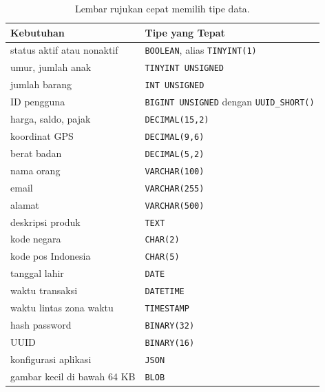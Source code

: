 \documentclass[11pt,a4paper]{article}
\begin{document}
\begin{table}[H]
	\centering
	\caption{Lembar rujukan cepat memilih tipe data.}
	\label{tab:cheat}
	\footnotesize
	\begin{tabularx}{\textwidth}{l X}
		\toprule
		Kebutuhan                   & Tipe yang Tepat                                        \\
		\midrule
		status aktif atau nonaktif  & \texttt{BOOLEAN}, alias \texttt{TINYINT(1)}            \\
		umur, jumlah anak           & \texttt{TINYINT UNSIGNED}                              \\
		jumlah barang               & \texttt{INT UNSIGNED}                                  \\
		ID pengguna                 & \texttt{BIGINT UNSIGNED} dengan \texttt{UUID\_SHORT()} \\
		harga, saldo, pajak         & \texttt{DECIMAL(15,2)}                                 \\
		koordinat GPS               & \texttt{DECIMAL(9,6)}                                  \\
		berat badan                 & \texttt{DECIMAL(5,2)}                                  \\
		nama orang                  & \texttt{VARCHAR(100)}                                  \\
		email                       & \texttt{VARCHAR(255)}                                  \\
		alamat                      & \texttt{VARCHAR(500)}                                  \\
		deskripsi produk            & \texttt{TEXT}                                          \\
		kode negara                 & \texttt{CHAR(2)}                                       \\
		kode pos Indonesia          & \texttt{CHAR(5)}                                       \\
		tanggal lahir               & \texttt{DATE}                                          \\
		waktu transaksi             & \texttt{DATETIME}                                      \\
		waktu lintas zona waktu     & \texttt{TIMESTAMP}                                     \\
		hash password               & \texttt{BINARY(32)}                                    \\
		UUID                        & \texttt{BINARY(16)}                                    \\
		konfigurasi aplikasi        & \texttt{JSON}                                          \\
		gambar kecil di bawah 64 KB & \texttt{BLOB}                                          \\
		\bottomrule
	\end{tabularx}
\end{table}
\end{document}
